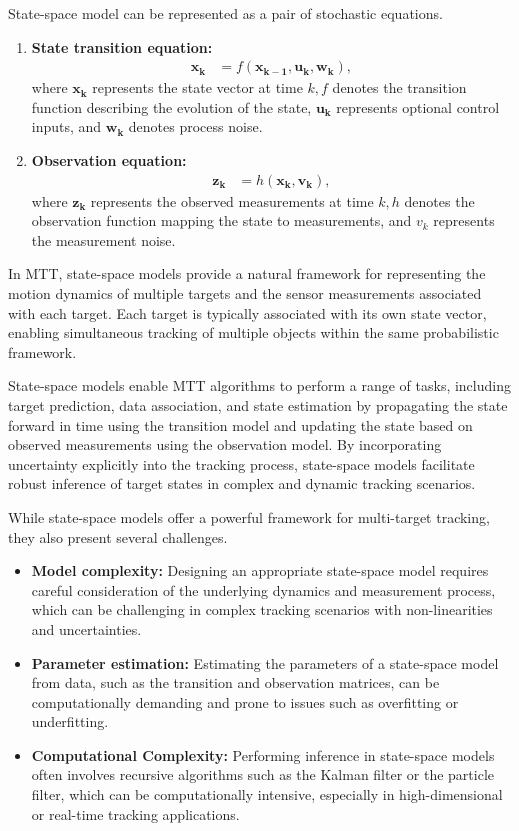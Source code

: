 State-space model can be represented as a pair of stochastic equations.
\begin{enumerate}
    \item \textbf{State transition equation:}
        \begin{align}
                  \mathbf{x_k} &= f(\mathbf{x_{k-1}}, \mathbf{u_k}, \mathbf{w_k}), \label{eq:state_space_model_state}
        \end{align}
        where $\mathbf{x_k}$ represents the state vector at time $k, f$ denotes the transition function describing the
        evolution of the state, $\mathbf{u_k}$ represents optional control inputs, and $\mathbf{w_k}$ denotes process
    noise.
    \item \textbf{Observation equation:}
        \begin{align}
            \mathbf{z_k} &= h(\mathbf{x_{k}}, \mathbf{v_k}), \label{eq:state_space_model_observation}
        \end{align}
        where $\mathbf{z_k}$ represents the observed measurements at time $k, h$ denotes the observation function
    mapping the
    state to measurements, and $v_k$ represents the measurement noise.
\end{enumerate}

In MTT, state-space models provide a natural framework for representing the motion dynamics of multiple targets and the sensor measurements associated with each target. Each target is typically associated with its own state vector, enabling simultaneous tracking of multiple objects within the same probabilistic framework.

State-space models enable MTT algorithms to perform a range of tasks, including target prediction, data association, and state estimation by propagating the state forward in time using the transition model and updating the state based on observed measurements using the observation model. By incorporating uncertainty explicitly into the tracking process, state-space models facilitate robust inference of target states in complex and dynamic tracking scenarios.

While state-space models offer a powerful framework for multi-target tracking, they also present several challenges.
\begin{itemize}
    \item \textbf{Model complexity:} Designing an appropriate state-space model requires careful consideration of the
    underlying dynamics and measurement process, which can be challenging in complex tracking scenarios with non-linearities and uncertainties.
    \item \textbf{Parameter estimation:} Estimating the parameters of a state-space model from data, such as the transition and observation matrices, can be computationally demanding and prone to issues such as overfitting or underfitting.
    \item \textbf{Computational Complexity:} Performing inference in state-space models often involves recursive algorithms such as the Kalman filter or the particle filter, which can be computationally intensive, especially in high-dimensional or real-time tracking applications.
\end{itemize}

